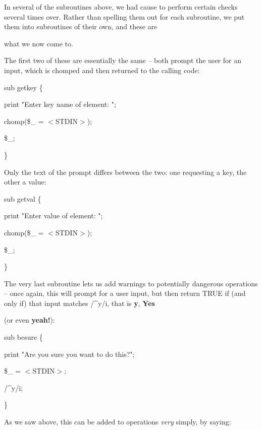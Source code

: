 \documentclass[a4paper,11pt]{book}
\begin{document}
\noindent 

\noindent In several of the subroutines above, we had cause to perform certain checks several times over. Rather than spelling them out for each subroutine, we put them into subroutines of their own, and these are

\noindent what we now come to.

\noindent 

\noindent The first two of these are essentially the same -- both prompt the user for an input, which is chomped and then returned to the calling code:

\noindent 

\noindent sub getkey \{

\noindent print "Enter key name of element: ";

\noindent chomp(\$\_  = $<$STDIN$>$);

\noindent \$\_;

\noindent \}

\noindent 

\noindent 

\noindent Only the text of the prompt differs between the two: one requesting a key, the other a value:

\noindent 

\noindent sub getval \{

\noindent print "Enter value of element: ";

\noindent chomp(\$\_  = $<$STDIN$>$);

\noindent \$\_;

\noindent \}

\noindent 

\noindent The very last subroutine lets us add warnings to potentially dangerous operations -- once again, this will prompt for a user input, but then return TRUE if (and only if) that input matches /\^{}y/i, that is \textbf{y}, \textbf{Yes}

\noindent (or even \textbf{yeah!}):

\noindent 

\noindent sub besure \{

\noindent print "Are you sure you want to do this?";

\noindent \$\_  = $<$STDIN$>$;

\noindent /\^{}y/i;

\noindent \}

\noindent 

\noindent As we saw above, this can be added to operations \textit{very }simply, by saying:
\end{document}
